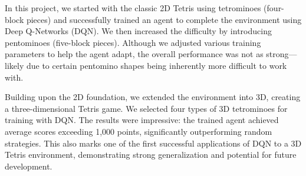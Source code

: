 In this project, we started with the classic 2D Tetris using tetrominoes (four-block pieces) and successfully trained an agent to complete the environment using Deep Q-Networks (DQN). We then increased the difficulty by introducing pentominoes (five-block pieces). Although we adjusted various training parameters to help the agent adapt, the overall performance was not as strong—likely due to certain pentomino shapes being inherently more difficult to work with.

Building upon the 2D foundation, we extended the environment into 3D, creating a three-dimensional Tetris game. We selected four types of 3D tetrominoes for training with DQN. The results were impressive: the trained agent achieved average scores exceeding 1,000 points, significantly outperforming random strategies. This also marks one of the first successful applications of DQN to a 3D Tetris environment, demonstrating strong generalization and potential for future development.